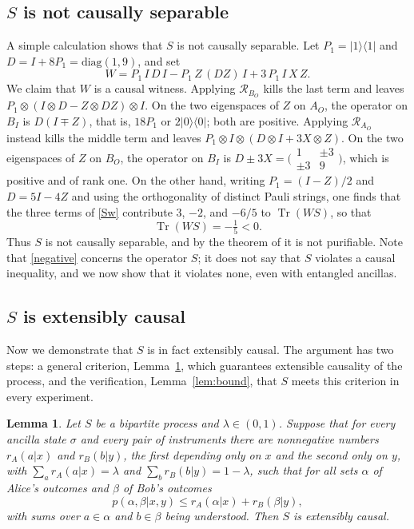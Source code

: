 \documentclass[aps,prl,reprint,superscriptaddress,nofootinbib,longbibliography,raggedbottom]{revtex4-2}
\DeclareMathOperator{\Tr}{Tr}
\newcommand{\R}{\mathcal R}
\newcommand{\ket}[1]{\lvert #1\rangle}
\newcommand{\bra}[1]{\langle #1\rvert}
\newcommand{\proj}[1]{\ket{#1}\!\bra{#1}}
\newtheorem{lemma}{Lemma}
\begin{document}
\subsection*{$S$ is not causally separable}
A simple calculation shows that $S$ is not causally separable. Let $P_1=\proj1$ and $D=I+8P_1=\mathrm{diag}(1,9)$, and set
\begin{equation}\label{Sw}
W=P_1\,I\,D\,I-P_1\,Z\,(DZ)\,I+3\,P_1\,I\,X\,Z .
\end{equation}
We claim that $W$ is a causal witness. Applying $\R_{B_O}$ kills the
last term and leaves $P_1\otimes(I\otimes D-Z\otimes DZ)\otimes I$. On the
two eigenspaces of $Z$ on $A_O$, the operator on $B_I$ is $D(I\mp Z)$, that
is, $18P_1$ or $2\proj0$; both are positive. Applying $\R_{A_O}$ instead
kills the middle term and leaves
$P_1\otimes I\otimes(D\otimes I+3X\otimes Z)$. On the two eigenspaces of
$Z$ on $B_O$, the operator on $B_I$ is
$D\pm3X=\bigl(\begin{smallmatrix}1&\pm3\\\pm3&9\end{smallmatrix}\bigr)$,
which is positive and of rank one. On the other hand, writing
$P_1=(I-Z)/2$ and $D=5I-4Z$ and using the orthogonality of distinct Pauli
strings, one finds that
the three terms of \eqref{Sw} contribute $3$, $-2$, and $-6/5$ to
$\Tr(WS)$, so that
\begin{equation}\label{negative}
\Tr(WS)=-\tfrac15<0 .
\end{equation}
Thus $S$ is not causally separable, and by the theorem of \cite{YQSM,BLO}
it is not purifiable. Note that \eqref{negative} concerns the operator $S$;
it does not say that $S$ violates a causal inequality, and we now show that
it violates none, even with entangled ancillas.

\medskip
\subsection*{$S$ is extensibly causal}
Now we demonstrate that $S$ is in fact extensibly causal. The argument has
two steps: a general criterion, Lemma~\ref{lem:flow}, which guarantees extensible causality of the process, and the verification, Lemma~\ref{lem:bound}, that $S$ meets this
criterion in every experiment.

\begin{lemma}\label{lem:flow}
Let $S$ be a bipartite process and $\lambda\in(0,1)$. Suppose that for
every ancilla state $\sigma$ and every pair of instruments there are
nonnegative numbers $r_A(a|x)$ and $r_B(b|y)$, the first depending only on
$x$ and the second only on $y$, with $\sum_ar_A(a|x)=\lambda$ and
$\sum_br_B(b|y)=1-\lambda$, such that for all sets $\alpha$ of Alice's
outcomes and $\beta$ of Bob's outcomes
\begin{equation}\label{rectangle}
p(\alpha,\beta|x,y)\leq r_A(\alpha|x)+r_B(\beta|y),
\end{equation}
with sums over $a\in\alpha$ and $b\in\beta$ being understood. Then $S$ is
extensibly causal.
\end{lemma}
\end{document}

